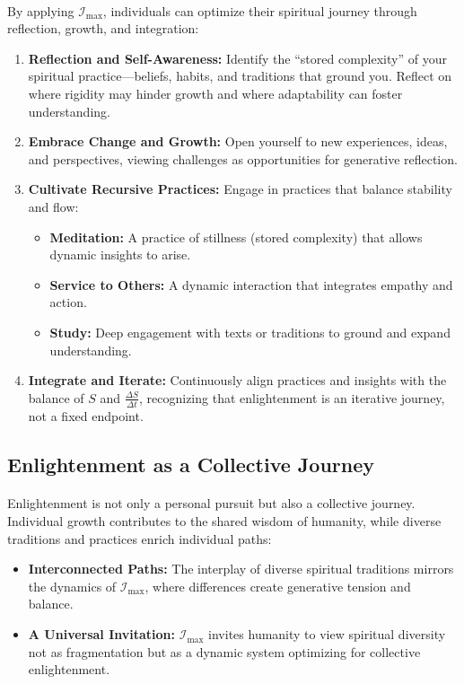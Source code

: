 \documentclass[12pt]{article}
\begin{document}
\paragraph{}
By applying \(\mathcal{I}_{\text{max}}\), individuals can optimize their spiritual journey through reflection, growth, and integration:
\begin{enumerate}
    \item \textbf{Reflection and Self-Awareness:} Identify the “stored complexity” of your spiritual practice—beliefs, habits, and traditions that ground you. Reflect on where rigidity may hinder growth and where adaptability can foster understanding.
    \item \textbf{Embrace Change and Growth:} Open yourself to new experiences, ideas, and perspectives, viewing challenges as opportunities for generative reflection.
    \item \textbf{Cultivate Recursive Practices:} Engage in practices that balance stability and flow:
        \begin{itemize}
            \item \textbf{Meditation:} A practice of stillness (stored complexity) that allows dynamic insights to arise.
            \item \textbf{Service to Others:} A dynamic interaction that integrates empathy and action.
            \item \textbf{Study:} Deep engagement with texts or traditions to ground and expand understanding.
        \end{itemize}
    \item \textbf{Integrate and Iterate:} Continuously align practices and insights with the balance of \(S\) and \(\frac{\Delta S}{\Delta t}\), recognizing that enlightenment is an iterative journey, not a fixed endpoint.
\end{enumerate}

\subsection{Enlightenment as a Collective Journey}
\paragraph{}
Enlightenment is not only a personal pursuit but also a collective journey. Individual growth contributes to the shared wisdom of humanity, while diverse traditions and practices enrich individual paths:
\begin{itemize}
    \item \textbf{Interconnected Paths:} The interplay of diverse spiritual traditions mirrors the dynamics of \(\mathcal{I}_{\text{max}}\), where differences create generative tension and balance.
    \item \textbf{A Universal Invitation:} \(\mathcal{I}_{\text{max}}\) invites humanity to view spiritual diversity not as fragmentation but as a dynamic system optimizing for collective enlightenment.
\end{itemize}
\end{document}
